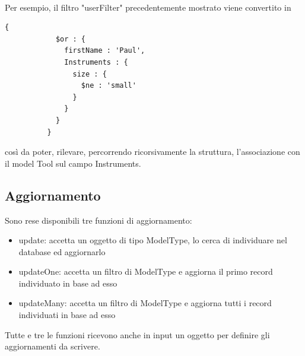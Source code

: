 \documentclass[a4paper, 12pt]{report}
\begin{document}
        \paragraph*{}
        Per esempio, il filtro "userFilter" precedentemente mostrato viene convertito in
        \begin{Verbatim}[samepage=true]
          {
            $or : {
              firstName : 'Paul',
              Instruments : {
                size : {
                  $ne : 'small'
                }
              }
            }
          }
        \end{Verbatim}
        così da poter, rilevare, percorrendo ricorsivamente la struttura, l'associazione con il model Tool sul campo Instruments.
    \newpage
    \subsection{Aggiornamento}
      Sono rese disponibili tre funzioni di aggiornamento: 
      \begin{itemize}
        \item update: accetta un oggetto di tipo ModelType, lo cerca di individuare nel database ed aggiornarlo
        \item updateOne: accetta un filtro di ModelType e aggiorna il primo record individuato in base ad esso
        \item updateMany: accetta un filtro di ModelType e aggiorna tutti i record individuati in base ad esso
      \end{itemize} 
      Tutte e tre le funzioni ricevono anche in input un oggetto per definire gli aggiornamenti da scrivere.
\end{document}
